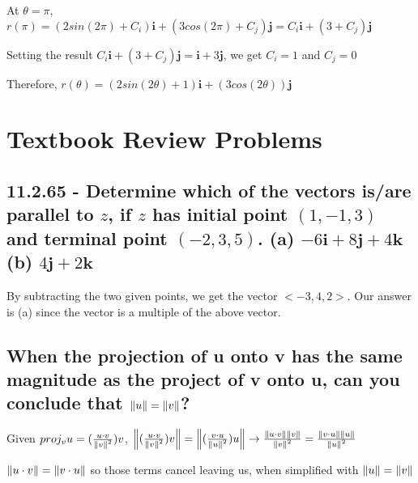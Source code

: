 \documentclass{article}
\begin{document}
\par\noindent\large At $\theta = \pi$, $r(\pi) = (2sin(2\pi) + C_{i})\textbf{i} + (3cos(2\pi) + C_{j})\textbf{j} = C_{i}\textbf{i} + (3 + C_{j})\textbf{j}$
\par\noindent\large Setting the result $C_{i}\textbf{i} + (3 + C_{j})\textbf{j} = \textbf{i} + 3\textbf{j}$, we get $C_{i} = 1$ and $C_{j} = 0$
\par\noindent\large Therefore, $r(\theta) = (2sin(2\theta) +1)\textbf{i} + (3cos(2\theta))\textbf{j}$

\section{Textbook Review Problems}
\subsection{11.2.65 - Determine which of the vectors is/are parallel to $z$, if $z$ has initial point $(1, -1, 3)$ and terminal point $(-2, 3, 5)$.  (a) $-6\textbf{i} + 8\textbf{j} + 4\textbf{k}$ (b) $4\textbf{j} + 2\textbf{k}$}
\par\noindent\large By subtracting the two given points, we get the vector $<-3, 4, 2>$.  Our answer is (a) since the vector is a multiple of the above vector.

\subsection{When the projection of \textbf{u} onto \textbf{v} has the same magnitude as the project of \textbf{v} onto \textbf{u}, can you conclude that $\norm{u} = \norm{v}$?}

\par\noindent\Large Given $proj_{v}u = (\frac{u \cdot v}{\norm{v}^{2}})v$, $\norm{(\frac{u \cdot v}{\norm{v}^{2}})v} = \norm{(\frac{v \cdot u}{\norm{u}^{2}})u} \rightarrow \frac{\norm{u \cdot v}\norm{v}}{\norm{v}^{2}} = \frac{\norm{v \cdot u}\norm{u}}{\norm{u}^{2}}$
\par\noindent\large $\norm{u \cdot v} = \norm{v \cdot u}$ so those terms cancel leaving us, when simplified with $\norm{u} = \norm{v}$
\end{document}
